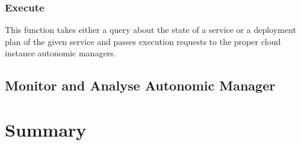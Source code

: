 \subsubsection{Execute}
This function takes either a query about the state of a service or a deployment plan of the given service and passes execution requests to the proper cloud instance autonomic managers.
\subsection{Monitor and Analyse Autonomic Manager}

\section{Summary}
